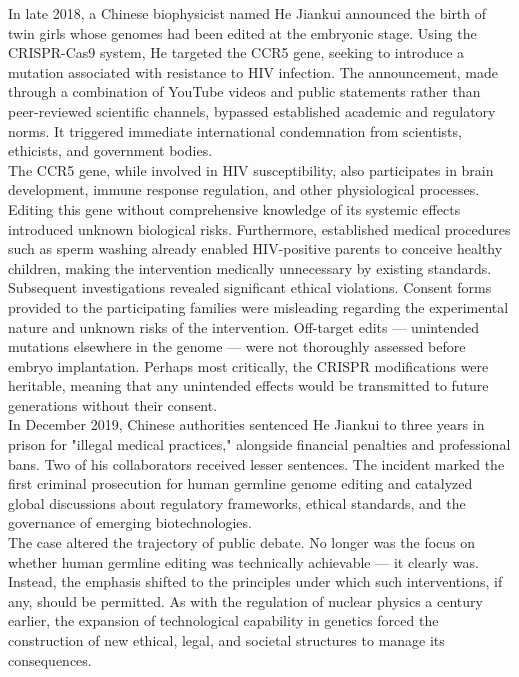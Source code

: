 \vfill
\begin{shadedstory}

In late 2018, a Chinese biophysicist named He Jiankui announced the birth of twin girls whose genomes had been edited at the embryonic stage. Using the CRISPR-Cas9 system, He targeted the CCR5 gene, seeking to introduce a mutation associated with resistance to HIV infection. The announcement, made through a combination of YouTube videos and public statements rather than peer-reviewed scientific channels, bypassed established academic and regulatory norms. It triggered immediate international condemnation from scientists, ethicists, and government bodies.\\

The CCR5 gene, while involved in HIV susceptibility, also participates in brain development, immune response regulation, and other physiological processes. Editing this gene without comprehensive knowledge of its systemic effects introduced unknown biological risks. Furthermore, established medical procedures such as sperm washing already enabled HIV-positive parents to conceive healthy children, making the intervention medically unnecessary by existing standards.\\

Subsequent investigations revealed significant ethical violations. Consent forms provided to the participating families were misleading regarding the experimental nature and unknown risks of the intervention. Off-target edits — unintended mutations elsewhere in the genome — were not thoroughly assessed before embryo implantation. Perhaps most critically, the CRISPR modifications were heritable, meaning that any unintended effects would be transmitted to future generations without their consent.\\

In December 2019, Chinese authorities sentenced He Jiankui to three years in prison for "illegal medical practices," alongside financial penalties and professional bans. Two of his collaborators received lesser sentences. The incident marked the first criminal prosecution for human germline genome editing and catalyzed global discussions about regulatory frameworks, ethical standards, and the governance of emerging biotechnologies.\\

The case altered the trajectory of public debate. No longer was the focus on whether human germline editing was technically achievable — it clearly was. Instead, the emphasis shifted to the principles under which such interventions, if any, should be permitted. As with the regulation of nuclear physics a century earlier, the expansion of technological capability in genetics forced the construction of new ethical, legal, and societal structures to manage its consequences.

\end{shadedstory}
\vfill
